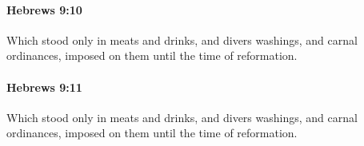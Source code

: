 		\paragraph{Hebrews 9:10} %
			\label{HEBREWS-9-10}

			Which stood only in meats and drinks, and divers washings, and carnal ordinances, imposed on them until the time of reformation.

			\begin{framed}
			\scriptsize
				\begin{compactdesc}
					\item[SBLG] 
				\end{compactdesc}
			\end{framed}

		\paragraph{Hebrews 9:11} %
			\label{HEBREWS-9-11}

			Which stood only in meats and drinks, and divers washings, and carnal ordinances, imposed on them until the time of reformation.

